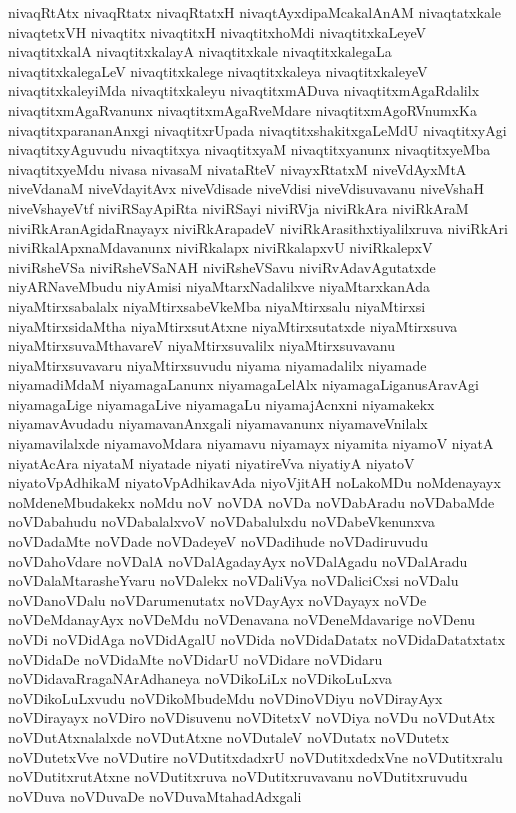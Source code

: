 {nivaqRtAtx
nivaqRtatx
nivaqRtatxH
nivaqtAyxdipaMcakalAnAM
nivaqtatxkale
nivaqtetxVH
nivaqtitx
nivaqtitxH
nivaqtitxhoMdi
nivaqtitxkaLeyeV
nivaqtitxkalA
nivaqtitxkalayA
nivaqtitxkale
nivaqtitxkalegaLa
nivaqtitxkalegaLeV
nivaqtitxkalege
nivaqtitxkaleya
nivaqtitxkaleyeV
nivaqtitxkaleyiMda
nivaqtitxkaleyu
nivaqtitxmADuva
nivaqtitxmAgaRdalilx
nivaqtitxmAgaRvanunx
nivaqtitxmAgaRveMdare
nivaqtitxmAgoRVnumxKa
nivaqtitxparananAnxgi
nivaqtitxrUpada
nivaqtitxshakitxgaLeMdU
nivaqtitxyAgi
nivaqtitxyAguvudu
nivaqtitxya
nivaqtitxyaM
nivaqtitxyanunx
nivaqtitxyeMba
nivaqtitxyeMdu
nivasa
nivasaM
nivataRteV
nivayxRtatxM
niveVdAyxMtA
niveVdanaM
niveVdayitAvx
niveVdisade
niveVdisi
niveVdisuvavanu
niveVshaH
niveVshayeVtf
niviRSayApiRta
niviRSayi
niviRVja
niviRkAra
niviRkAraM
niviRkAranAgidaRnayayx
niviRkArapadeV
niviRkArasithxtiyalilxruva
niviRkAri
niviRkalApxnaMdavanunx
niviRkalapx
niviRkalapxvU
niviRkalepxV
niviRsheVSa
niviRsheVSaNAH
niviRsheVSavu
niviRvAdavAgutatxde
niyARNaveMbudu
niyAmisi
niyaMtarxNadalilxve
niyaMtarxkanAda
niyaMtirxsabalalx
niyaMtirxsabeVkeMba
niyaMtirxsalu
niyaMtirxsi
niyaMtirxsidaMtha
niyaMtirxsutAtxne
niyaMtirxsutatxde
niyaMtirxsuva
niyaMtirxsuvaMthavareV
niyaMtirxsuvalilx
niyaMtirxsuvavanu
niyaMtirxsuvavaru
niyaMtirxsuvudu
niyama
niyamadalilx
niyamade
niyamadiMdaM
niyamagaLanunx
niyamagaLelAlx
niyamagaLiganusAravAgi
niyamagaLige
niyamagaLive
niyamagaLu
niyamajAcnxni
niyamakekx
niyamavAvudadu
niyamavanAnxgali
niyamavanunx
niyamaveVnilalx
niyamavilalxde
niyamavoMdara
niyamavu
niyamayx
niyamita
niyamoV
niyatA
niyatAcAra
niyataM
niyatade
niyati
niyatireVva
niyatiyA
niyatoV
niyatoVpAdhikaM
niyatoVpAdhikavAda
niyoVjitAH
noLakoMDu
noMdenayayx
noMdeneMbudakekx
noMdu
noV
noVDA
noVDa
noVDabAradu
noVDabaMde
noVDabahudu
noVDabalalxvoV
noVDabalulxdu
noVDabeVkenunxva
noVDadaMte
noVDade
noVDadeyeV
noVDadihude
noVDadiruvudu
noVDahoVdare
noVDalA
noVDalAgadayAyx
noVDalAgadu
noVDalAradu
noVDalaMtarasheYvaru
noVDalekx
noVDaliVya
noVDaliciCxsi
noVDalu
noVDanoVDalu
noVDarumenutatx
noVDayAyx
noVDayayx
noVDe
noVDeMdanayAyx
noVDeMdu
noVDenavana
noVDeneMdavarige
noVDenu
noVDi
noVDidAga
noVDidAgalU
noVDida
noVDidaDatatx
noVDidaDatatxtatx
noVDidaDe
noVDidaMte
noVDidarU
noVDidare
noVDidaru
noVDidavaRragaNArAdhaneya
noVDikoLiLx
noVDikoLuLxva
noVDikoLuLxvudu
noVDikoMbudeMdu
noVDinoVDiyu
noVDirayAyx
noVDirayayx
noVDiro
noVDisuvenu
noVDitetxV
noVDiya
noVDu
noVDutAtx
noVDutAtxnalalxde
noVDutAtxne
noVDutaleV
noVDutatx
noVDutetx
noVDutetxVve
noVDutire
noVDutitxdadxrU
noVDutitxdedxVne
noVDutitxralu
noVDutitxrutAtxne
noVDutitxruva
noVDutitxruvavanu
noVDutitxruvudu
noVDuva
noVDuvaDe
noVDuvaMtahadAdxgali
}
